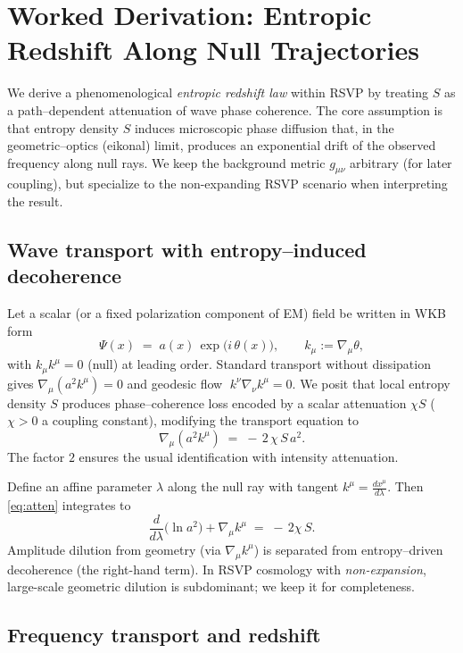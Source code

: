 \documentclass[a4paper,11pt,openany]{book}
\begin{document}
\section{Worked Derivation: Entropic Redshift Along Null Trajectories}

We derive a phenomenological \emph{entropic redshift law} within RSVP by treating $S$ as a
path–dependent attenuation of wave phase coherence. The core assumption is that entropy
density $S$ induces microscopic phase diffusion that, in the geometric–optics (eikonal)
limit, produces an exponential drift of the observed frequency along null rays. We keep the
background metric $g_{\mu\nu}$ arbitrary (for later coupling), but specialize to the
non-expanding RSVP scenario when interpreting the result.

\subsection{Wave transport with entropy–induced decoherence}

Let a scalar (or a fixed polarization component of EM) field be written in WKB form
\[
\Psi(x) \;=\; a(x)\,\exp\!\big( i\,\theta(x)\big), 
\qquad k_\mu := \nabla_\mu \theta,
\]
with $k_\mu k^\mu = 0$ (null) at leading order. Standard transport without dissipation gives
\(
\nabla_\mu\!\left(a^2 k^\mu\right)=0
\)
and geodesic flow $\;k^\nu\nabla_\nu k^\mu=0$.
We posit that local entropy density $S$ produces phase–coherence loss encoded by a scalar
attenuation $\chi S$ ($\chi>0$ a coupling constant), modifying the transport equation to
\begin{equation}
\label{eq:atten}
\nabla_\mu\!\left(a^2 k^\mu\right) \;=\; -\,2\,\chi\,S\,a^2.
\end{equation}
The factor $2$ ensures the usual identification with intensity attenuation.

Define an affine parameter $\lambda$ along the null ray with tangent $k^\mu = \frac{dx^\mu}{d\lambda}$.
Then \eqref{eq:atten} integrates to
\begin{equation}
\label{eq:aint}
\frac{d}{d\lambda}\big(\ln a^2\big) + \nabla_\mu k^\mu \;=\; -\,2\chi\,S.
\end{equation}
Amplitude dilution from geometry (via $\nabla_\mu k^\mu$) is separated from entropy–driven
decoherence (the right-hand term). In RSVP cosmology with \emph{non-expansion}, large-scale
geometric dilution is subdominant; we keep it for completeness.

\subsection{Frequency transport and redshift}
\end{document}
